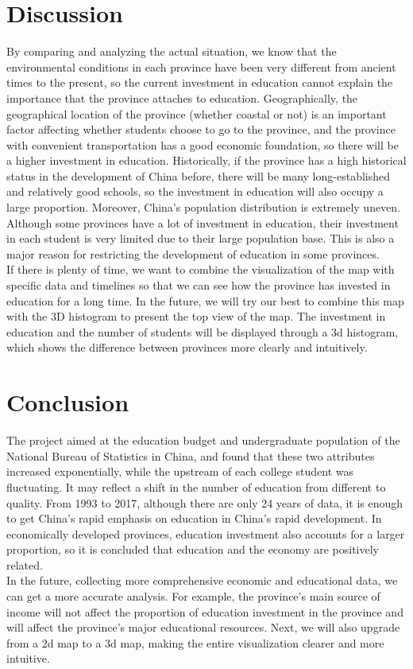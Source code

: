 \section{Discussion}
By comparing and analyzing the actual situation, we know that the environmental conditions in each province have been very different from ancient times to the present, so the current investment in education cannot explain the importance that the province attaches to education. Geographically, the geographical location of the province (whether coastal or not) is an important factor affecting whether students choose to go to the province, and the province with convenient transportation has a good economic foundation, so there will be a higher investment in education. Historically, if the province has a high historical status in the development of China before, there will be many long-established and relatively good schools, so the investment in education will also occupy a large proportion. Moreover, China's population distribution is extremely uneven. Although some provinces have a lot of investment in education, their investment in each student is very limited due to their large population base. This is also a major reason for restricting the development of education in some provinces.\\

\noindent If there is plenty of time, we want to combine the visualization of the map with specific data and timelines so that we can see how the province has invested in education for a long time. In the future, we will try our best to combine this map with the 3D histogram to present the top view of the map. \cite{du20043}The investment in education and the number of students will be displayed through a 3d histogram, which shows the difference between provinces more clearly and intuitively\cite{satyanarayan2014declarative}.

\section{Conclusion}
\label{sec:conclusion}

The project aimed at the education budget and undergraduate population of the National Bureau of Statistics in China, and found that these two attributes increased exponentially, while the upstream of each college student was fluctuating. It may reflect a shift in the number of education from different to quality. \cite{dougherty1995supervised}From 1993 to 2017, although there are only 24 years of data, it is enough to get China's rapid emphasis on education in China's rapid development. In economically developed provinces, education investment also accounts for a larger proportion, so it is concluded that education and the economy are positively related.\\

\noindent In the future, collecting more comprehensive economic and educational data, we can get a more accurate analysis.\cite{dibiase1992animation} For example, the province’s main source of income will not affect the proportion of education investment in the province and will affect the province’s major educational resources. Next, we will also upgrade from a 2d map to a 3d map, making the entire visualization clearer and more intuitive. 
